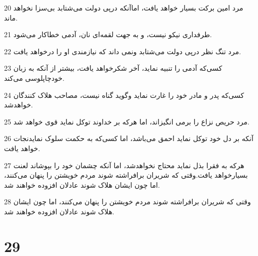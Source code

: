 \par 20 مرد امین برکت بسیار خواهد یافت، اماآنکه در‌پی دولت می‌شتابد بی‌سزا نخواهد ماند.
\par 21 طرفداری نیکو نیست، و به جهت لقمه‌ای نان، آدمی خطاکار می‌شود.
\par 22 مرد تنگ نظر در‌پی دولت می‌شتابد ونمی داند که نیازمندی او را درخواهد یافت.
\par 23 کسی‌که آدمی را تنبیه نماید، آخر شکرخواهد یافت، بیشتر از آنکه به زبان خودچاپلوسی می‌کند.
\par 24 کسی‌که پدر و مادر خود را غارت نماید وگوید گناه نیست، مصاحب هلاک کنندگان خواهدشد.
\par 25 مرد حریص نزاع را برمی انگیزاند، اما هر‌که بر خداوند توکل نماید قوی خواهد شد.
\par 26 آنکه بر دل خود توکل نماید احمق می‌باشد، اما کسی‌که به حکمت سلوک نمایدنجات خواهد یافت.
\par 27 هر‌که به فقرا بذل نماید محتاج نخواهدشد، اما آنکه چشمان خود را بپوشاند لعنت بسیارخواهد یافت.وقتی که شریران برافراشته شوند مردم خویشتن را پنهان می‌کنند، اما چون ایشان هلاک شوند عادلان افزوده خواهند شد.
\par 28 وقتی که شریران برافراشته شوند مردم خویشتن را پنهان می‌کنند، اما چون ایشان هلاک شوند عادلان افزوده خواهند شد.
 
\chapter{29}

